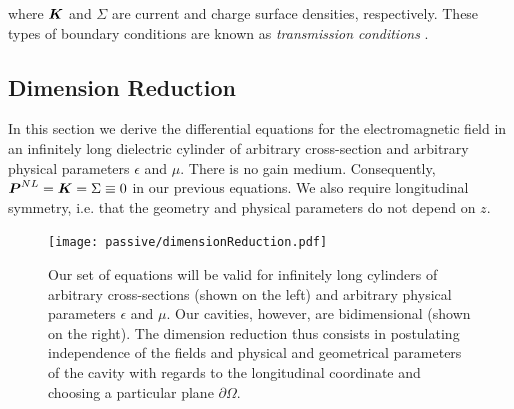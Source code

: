 where $\boldsymbol{K}$ and $\Sigma$ are current and charge surface densities, respectively. 
These types of boundary conditions are known as \textit{transmission conditions} 
\cite{COL2013}.

\subsection{Dimension Reduction}
In this section we derive the differential equations 
for the electromagnetic field in an infinitely long
dielectric cylinder of arbitrary cross-section and arbitrary
physical parameters $\epsilon$ and $\mu$. There is no gain medium.
Consequently, $\boldsymbol{P}^{NL}=\boldsymbol{K}=\Sigma\equiv0$ in our previous equations.
We also require longitudinal symmetry, i.e. that the geometry and 
physical parameters do not depend on $z$. 

\begin{figure}
 \centering
 \texttt{[image: passive/dimensionReduction.pdf]}
 \caption[Schematic view of the reduction of Maxwell's equations from 3D to 2D]
	 {Our set of equations will be valid for infinitely long cylinders of
	  arbitrary cross-sections (shown on the left) and arbitrary physical parameters
	  $\epsilon$ and $\mu$. Our cavities, however, are bidimensional (shown on the right). 
	  The dimension reduction thus consists in postulating independence of the fields
	  and physical and geometrical parameters of the cavity with regards to the longitudinal coordinate 
	  and choosing a particular plane $\partial\Omega$.}
\end{figure}

